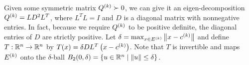 % 
% 
% 
% 
% 
% 
% 
% 
% 
% 
% 
% 
% 


Given some symmetric matrix ${Q^{(k)}} \succ 0$, we can give it an eigen-decomposition ${Q^{(k)}} = L D^2 L^T$,
where $L^TL = I$ and $D$ is a diagonal matrix with nonnegative entries.
In fact, because we require ${Q^{(k)}}$ to be positive definite, the diagonal entries of $D$ are strictly positive.
Let $\delta = \max_{x\in {E^{(k)}}}\left\|x-c^{(k)}\right\|$ and define $T:\mathbb R^n \rightarrow \mathbb R^n$ by $T(x) = \delta DL^T\left(x - c^{(k)}\right)$.
Note that $T$ is invertible and maps $ {E^{(k)}}$ onto the $\delta$-ball $B_2(0,\delta) = \left\{u \in \mathbb R^n \; | \; \|u\| \le \delta\right\}$.


